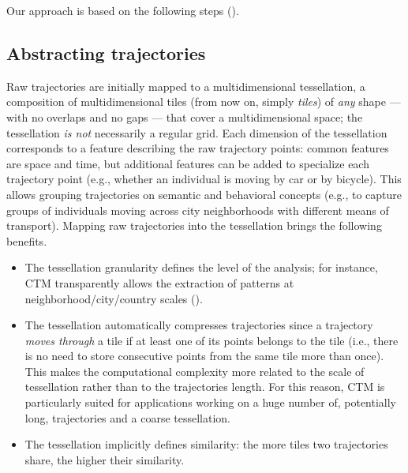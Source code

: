\documentclass[
]{ceurart}
\begin{document}
Our approach is based on the following steps ().

\subsection{Abstracting trajectories}
Raw trajectories are initially mapped to a multidimensional tessellation, a composition of multidimensional tiles (from now on, simply \textit{tiles}) of \textit{any} shape --- with no overlaps and no gaps --- that cover a multidimensional space; the tessellation \textit{is not} necessarily a regular grid.
Each dimension of the tessellation corresponds to a feature describing the raw trajectory points: common features are space and time, but additional features can be added to specialize each trajectory point (e.g., whether an individual is moving by car or by bicycle).
This allows grouping trajectories on semantic and behavioral concepts (e.g., to capture groups of individuals moving across city neighborhoods with different means of transport).
Mapping raw trajectories into the tessellation brings the following benefits.
\begin{itemize}
    \item The tessellation granularity defines the level of the analysis; for instance, CTM transparently allows the extraction of patterns at neighborhood/city/country scales ().
    \item The tessellation automatically compresses trajectories since a trajectory \textit{moves through} a tile if at least one of its points belongs to the tile (i.e., there is no need to store consecutive points from the same tile more than once). This makes the computational complexity more related to the scale of tessellation rather than to the trajectories length. For this reason, CTM is particularly suited for applications working on a huge number of, potentially long, trajectories and a coarse tessellation.
    \item The tessellation implicitly defines similarity: the more tiles two trajectories share, the higher their similarity.
\end{itemize}
\end{document}
